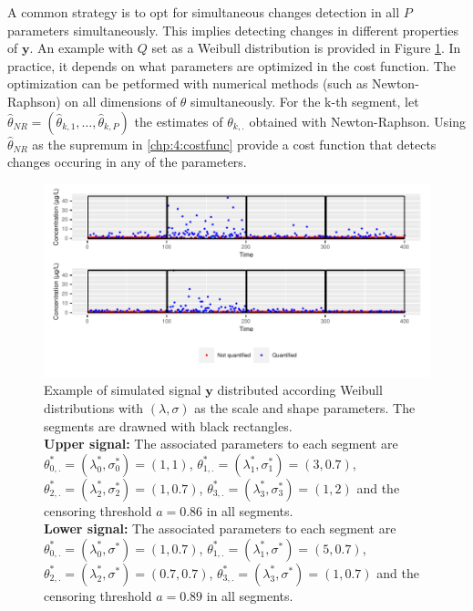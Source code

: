 A common strategy is to opt for simultaneous changes detection in all $P$ parameters simultaneously. This implies detecting changes in different properties of $\bm y$. An example with $Q$ set as a Weibull distribution is provided in Figure \ref{fig:param_ex}. In practice, it depends on what parameters are optimized in the cost function. The optimization can be petformed with numerical methods (such as Newton-Raphson) on all dimensions of $\theta$ simultaneously. For the k-th segment, let $\widehat{\theta}_{NR} = (\widehat{\theta}_{k,1},\dots,\widehat{\theta}_{k,P})$ the estimates of $\theta_{k,.}$ obtained with Newton-Raphson. Using $\widehat{\theta}_{NR}$ as the supremum in \ref{chp:4:costfunc} provide a cost function that detects changes occuring in any of the parameters.  

\begin{figure}[ht]
    \centering
    \includegraphics{figs/Chap4/param_ex.pdf}
    \caption{Example of simulated signal $\bm y$ distributed according Weibull distributions with $(\lambda,\sigma)$ as the scale and shape parameters. The segments are drawned with black rectangles. \\ 
\textbf{Upper signal:} The associated parameters to each segment are $\theta^*_{0,.} = (\lambda^*_0,\sigma^*_0) = (1,1)$, $\theta^*_{1,.} = (\lambda^*_1,\sigma^*_1) = (3,0.7)$, $\theta^*_{2,.} = (\lambda^*_2,\sigma^*_2) = (1,0.7)$, $\theta^*_{3,.} = (\lambda^*_3,\sigma^*_3) = (1,2)$ and the censoring threshold $a = 0.86$ in all segments.\\
\textbf{Lower signal:} The associated parameters to each segment are $\theta^*_{0,.} = (\lambda^*_0,\sigma^*) = (1,0.7)$, $\theta^*_{1,.} = (\lambda^*_1,\sigma^*) = (5,0.7)$, $\theta^*_{2,.} = (\lambda^*_2,\sigma^*) = (0.7,0.7)$, $\theta^*_{3,.} = (\lambda^*_3,\sigma^*) = (1,0.7)$ and the censoring threshold $a = 0.89$ in all segments.}
    \label{fig:param_ex}
\end{figure}

